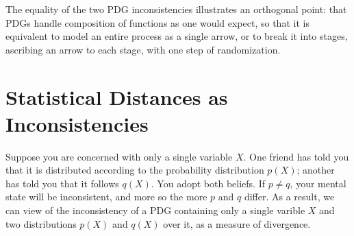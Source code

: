 \documentclass{article}
\makeatletter
\theoremstyle{plain}
\theoremstyle{definition}
\newcommand\aar{\@ifstar\aar@one@star\aar@plain}
\newcommand\aar@one@star{\@ifstar\aar@resize{\aar@plain*}}
\newcommand\aar@resize[1]{\sbox{\aar@content}{#1}\scaleleftright[3.8ex]
		{\Biggl\langle\!\!\!\!\Biggl\langle}{\usebox{\aar@content}}
		{\Biggr\rangle\!\!\!\!\Biggr\rangle}}
\makeatother
\begin{document}
The equality of the two PDG inconsistencies illustrates an orthogonal point: that PDGs handle composition of functions as one would expect, so that it is equivalent to model an entire process as a single arrow, or to break it into stages, ascribing an arrow to each stage, with one step of randomization.










\section{Statistical Distances as Inconsistencies} \label{sec:statdist}
Suppose you are concerned with only a single variable $X$. One friend has told you that it is distributed according to the probability distribution $p(X)$; another has told you that it follows $q(X)$. You adopt both beliefs. If $p \ne q$, your mental state will be inconsistent, and more so the more $p$ and $q$ differ.
As a result, we can view of the inconsistency of a PDG containing only a single varible $X$ and two distributions $p(X)$ and $q(X)$ over it, as a measure of divergence.
\end{document}

